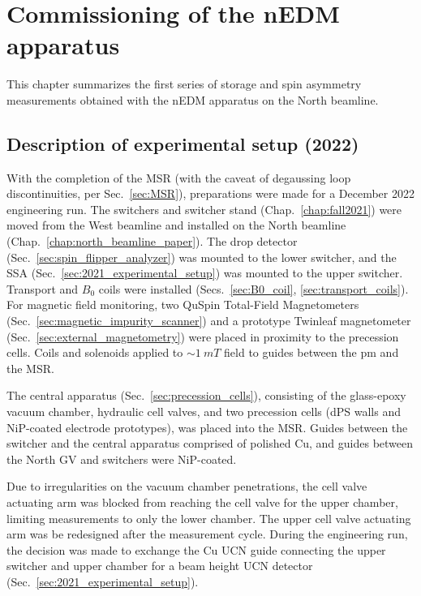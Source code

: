 
\chapter{Commissioning of the nEDM apparatus}\label{chap:nEDM_commissioning_dec2022}


This chapter summarizes the first series of storage and spin asymmetry measurements obtained with the nEDM apparatus on the North beamline. 


\section{Description of experimental setup (2022)}


With the completion of the MSR (with the caveat of degaussing loop discontinuities, per Sec.~\ref{sec:MSR}), preparations were made for a December 2022 engineering run. The switchers and switcher stand (Chap.~\ref{chap:fall2021}) were moved from the West beamline and installed on the North beamline (Chap.~\ref{chap:north_beamline_paper}). The drop detector (Sec.~\ref{sec:spin_flipper_analyzer}) was mounted to the lower switcher, and the SSA (Sec.~\ref{sec:2021_experimental_setup}) was mounted to the upper switcher. Transport and $B_0$ coils were installed (Secs.~\ref{sec:B0_coil}, \ref{sec:transport_coils}). For magnetic field monitoring, two QuSpin Total-Field Magnetometers (Sec.~\ref{sec:magnetic_impurity_scanner}) and a prototype Twinleaf magnetometer (Sec.~\ref{sec:external_magnetometry}) were placed in proximity to the precession cells. Coils and solenoids applied to $\sim \qty{1}{mT}$ field to guides between the \acrshort{pm} and the MSR.

The central apparatus (Sec.~\ref{sec:precession_cells}), consisting of the glass-epoxy vacuum chamber, hydraulic cell valves, and two precession cells (dPS walls and NiP-coated electrode prototypes), was placed into the MSR. Guides between the switcher and the central apparatus comprised of polished Cu, and guides between the North GV and switchers were NiP-coated.

Due to irregularities on the vacuum chamber penetrations, the cell valve actuating arm was blocked from reaching the cell valve for the upper chamber, limiting measurements to only the lower chamber. The upper cell valve actuating arm was be redesigned after the measurement cycle. During the engineering run, the decision was made to exchange the Cu UCN guide connecting the upper switcher and upper chamber for a beam height UCN detector (Sec.~\ref{sec:2021_experimental_setup}).


